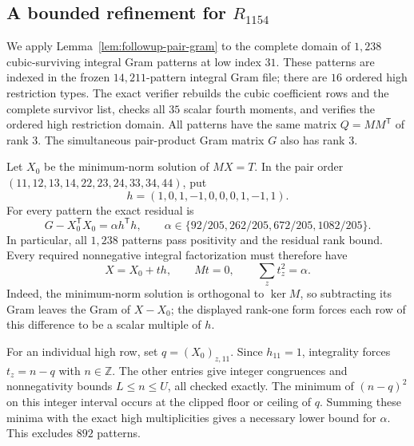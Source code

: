 \subsection{A bounded refinement for \texorpdfstring{$R_{1154}$}{R1154}}
\label{subsec:followup-r1154}

We apply Lemma~\ref{lem:followup-pair-gram} to the complete domain of
$1,238$ cubic-surviving integral Gram patterns at low index $31$.
These patterns are indexed in the frozen $14,211$-pattern integral Gram file;
there are $16$ ordered high restriction types. The exact verifier rebuilds the
cubic coefficient rows and the complete survivor list, checks all $35$ scalar
fourth moments, and verifies the ordered high restriction domain.
All patterns have the same matrix $Q=MM^{\mathsf T}$ of rank $3$.
The simultaneous pair-product Gram matrix $G$ also has rank $3$.

Let $X_0$ be the minimum-norm solution of $MX=T$. In the pair order
$(11,12,13,14,22,23,24,33,34,44)$, put
\[
 h=(1,0,1,-1,0,0,0,1,-1,1).
\]
For every pattern the exact residual is
\[
 G-X_0^{\mathsf T}X_0=\alpha h^{\mathsf T}h,
 \qquad
 \alpha\in\{92/205,262/205,672/205,1082/205\}.
\]
In particular, all $1,238$ patterns pass positivity and the residual rank
bound. Every required nonnegative integral factorization must therefore have
\[
 X=X_0+t h,\qquad Mt=0,\qquad \sum_z t_z^2=\alpha.
\]
Indeed, the minimum-norm solution is orthogonal to $\ker M$, so subtracting
its Gram leaves the Gram of $X-X_0$; the displayed rank-one form forces each
row of this difference to be a scalar multiple of $h$.

For an individual high row, set $q=(X_0)_{z,11}$. Since $h_{11}=1$,
integrality forces $t_z=n-q$ with $n\in\mathbb Z$. The other entries give
integer congruences and nonnegativity bounds $L\leq n\leq U$, all checked
exactly. The minimum of $(n-q)^2$ on this integer interval occurs at the
clipped floor or ceiling of $q$. Summing these minima with the exact high
multiplicities gives a necessary lower bound for $\alpha$.
This excludes $892$ patterns.

